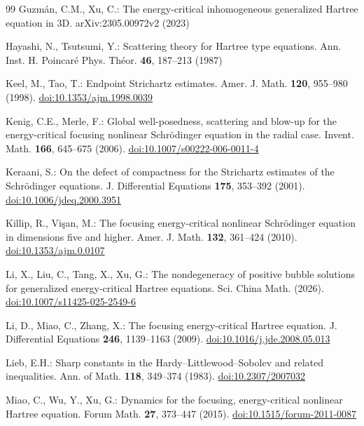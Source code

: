 \documentclass[preprint,12pt]{elsarticle}
\numberwithin{equation}{section}
\theoremstyle{remark}
\begin{document}
\begin{thebibliography}{99}
Guzm\'an, C.M., Xu, C.:
The energy-critical inhomogeneous generalized Hartree equation in 3D.
arXiv:2305.00972v2 (2023)

Hayashi, N., Tsutsumi, Y.:
Scattering theory for Hartree type equations.
Ann. Inst. H. Poincar\'e Phys. Th\'eor. \textbf{46}, 187--213 (1987)

Keel, M., Tao, T.:
Endpoint Strichartz estimates.
Amer. J. Math. \textbf{120}, 955--980 (1998).
\href{https://doi.org/10.1353/ajm.1998.0039}{doi:10.1353/ajm.1998.0039}

Kenig, C.E., Merle, F.:
Global well-posedness, scattering and blow-up for the energy-critical focusing nonlinear Schr\"odinger equation in the radial case.
Invent. Math. \textbf{166}, 645--675 (2006).
\href{https://doi.org/10.1007/s00222-006-0011-4}{doi:10.1007/s00222-006-0011-4}

Keraani, S.:
On the defect of compactness for the Strichartz estimates of the Schr\"odinger equations.
J. Differential Equations \textbf{175}, 353--392 (2001).
\href{https://doi.org/10.1006/jdeq.2000.3951}{doi:10.1006/jdeq.2000.3951}

Killip, R., Vi\c{s}an, M.:
The focusing energy-critical nonlinear Schr\"odinger equation in dimensions five and higher.
Amer. J. Math. \textbf{132}, 361--424 (2010).
\href{https://doi.org/10.1353/ajm.0.0107}{doi:10.1353/ajm.0.0107}

Li, X., Liu, C., Tang, X., Xu, G.:
The nondegeneracy of positive bubble solutions for generalized energy-critical Hartree equations.
Sci. China Math. (2026).
\href{https://doi.org/10.1007/s11425-025-2549-6}{doi:10.1007/s11425-025-2549-6}

Li, D., Miao, C., Zhang, X.:
The focusing energy-critical Hartree equation.
J. Differential Equations \textbf{246}, 1139--1163 (2009).
\href{https://doi.org/10.1016/j.jde.2008.05.013}{doi:10.1016/j.jde.2008.05.013}

Lieb, E.H.:
Sharp constants in the Hardy--Littlewood--Sobolev and related inequalities.
Ann. of Math. \textbf{118}, 349--374 (1983).
\href{https://doi.org/10.2307/2007032}{doi:10.2307/2007032}

Miao, C., Wu, Y., Xu, G.:
Dynamics for the focusing, energy-critical nonlinear Hartree equation.
Forum Math. \textbf{27}, 373--447 (2015).
\href{https://doi.org/10.1515/forum-2011-0087}{doi:10.1515/forum-2011-0087}


\end{thebibliography}
\end{document}
